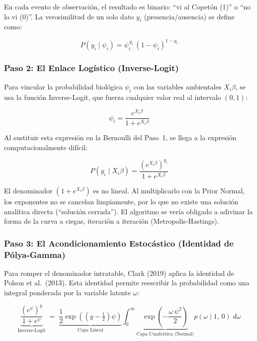 \documentclass[12pt]{article}
\begin{document}
En cada evento de observación, el resultado es binario: ``vi al Copetón (1)'' o ``no lo vi (0)''. La verosimilitud de un solo dato $y_i$ (presencia/ausencia) se define como:

\begin{equation}
  P(y_i \mid \psi_i) = \psi_i^{\,y_i}\,(1 - \psi_i)^{1-y_i}
\end{equation}

\subsubsection*{Paso 2: El Enlace Logístico (Inverse-Logit)}

Para vincular la probabilidad biológica $\psi_i$ con las variables ambientales $X_i\beta$, se usa la función Inverse-Logit, que fuerza cualquier valor real al intervalo $(0,1)$:

\begin{equation}
  \psi_i = \frac{e^{X_i\beta}}{1 + e^{X_i\beta}}
\end{equation}

Al sustituir esta expresión en la Bernoulli del Paso~1, se llega a la expresión computacionalmente difícil:

\begin{equation}
  P(y_i \mid X_i\beta) = \frac{\left(e^{X_i\beta}\right)^{y_i}}{1 + e^{X_i\beta}}
\end{equation}

El denominador $\left(1 + e^{X_i\beta}\right)$ es no lineal. Al multiplicarlo con la Prior Normal, los exponentes no se cancelan limpiamente, por lo que no existe una solución analítica directa (``solución cerrada''). El algoritmo se vería obligado a adivinar la forma de la curva a ciegas, iteración a iteración (Metropolis-Hastings).

\subsubsection*{Paso 3: El Acondicionamiento Estocástico (Identidad de Pólya-Gamma)}

Para romper el denominador intratable, Clark (2019) aplica la identidad de Polson et al.\ (2013). Esta identidad permite reescribir la probabilidad como una integral ponderada por la variable latente $\omega$:

\begin{equation}
  \underbrace{\dfrac{\left(e^{\psi}\right)^y}{1+e^{\psi}}}_{\text{Inverse-Logit}}
  \;=\;
  \underbrace{\dfrac{1}{2}\exp\!\left((y - \tfrac{1}{2})\psi\right)}_{\text{Capa Lineal}}
  \int_0^{\infty}
  \underbrace{\exp\!\left(-\dfrac{\omega\,\psi^2}{2}\right)}_{\text{Capa Cuadrática (Normal)}}
  p(\omega \mid 1,\, 0)\; d\omega
  \label{eq:pg_identity}
\end{equation}
\end{document}
